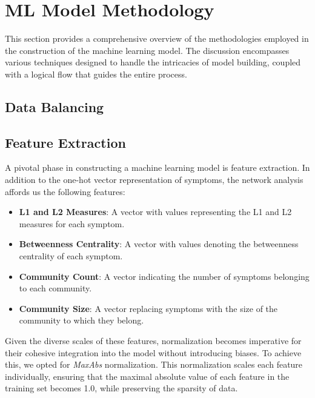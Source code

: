 \section{ML Model Methodology}
This section provides a comprehensive overview of the methodologies employed in the construction of the machine 
learning model. The discussion encompasses various techniques designed to handle the intricacies of model building, 
coupled with a logical flow that guides the entire process.


\subsection{Data Balancing}




\subsection{Feature Extraction}
A pivotal phase in constructing a machine learning model is feature extraction. In addition to the one-hot vector representation 
of symptoms, the network analysis affords us the following features:

\begin{itemize}
    \setlength\itemsep{0.4em} %
    \item \textbf{L1 and L2 Measures}: A vector with values representing the L1 and L2 measures for each symptom.
    \item \textbf{Betweenness Centrality}: A vector with values denoting the betweenness centrality of each symptom.
    \item \textbf{Community Count}: A vector indicating the number of symptoms belonging to each community.
    \item \textbf{Community Size}: A vector replacing symptoms with the size of the community to which they belong.
\end{itemize}
\vspace{0.4cm}

Given the diverse scales of these features, normalization becomes imperative for their cohesive integration into the model 
without introducing biases. To achieve this, we opted for \textit{MaxAbs} normalization. This normalization scales each feature 
individually, ensuring that the maximal absolute value of each feature in the training set becomes 1.0, while preserving the sparsity of data.


